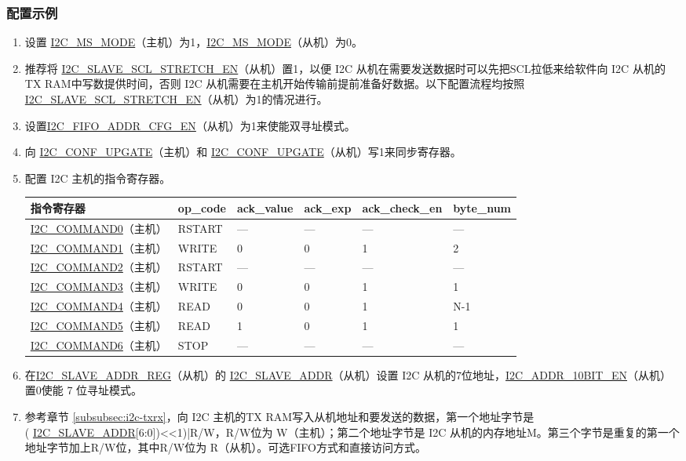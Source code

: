 \documentclass[main\_\_CN.tex]{subfiles}
\begin{document}
\subsubsection{配置示例}
\begin{enumerate}
\item 设置 \hyperref[fielddesc:I2CMSMODE]{I2C\_MS\_MODE}（主机）为1，\hyperref[fielddesc:I2CMSMODE]{I2C\_MS\_MODE}（从机）为0。
\item 推荐将 \hyperref[fielddesc:I2CSLAVESCLSTRETCHEN]{I2C\_SLAVE\_SCL\_STRETCH\_EN}（从机）置1，以便 I2C 从机在需要发送数据时可以先把SCL拉低来给软件向 I2C 从机的TX RAM中写数提供时间，否则 I2C 从机需要在主机开始传输前提前准备好数据。以下配置流程均按照\hyperref[fielddesc:I2CSLAVESCLSTRETCHEN]{I2C\_SLAVE\_SCL\_STRETCH\_EN}（从机）为1的情况进行。
\item 设置\hyperref[fielddesc:I2CFIFOADDRCFGEN]{I2C\_FIFO\_ADDR\_CFG\_EN}（从机）为1来使能双寻址模式。
\item 向 \hyperref[fielddesc:I2CCONFUPGATE]{I2C\_CONF\_UPGATE}（主机）和 \hyperref[fielddesc:I2CCONFUPGATE]{I2C\_CONF\_UPGATE}（从机）写1来同步寄存器。
\item 配置 I2C 主机的指令寄存器。
\begin{longtable}{ | p{4cm} | p{2cm} | p{2cm} | p{2cm} |p{2cm} | p{2cm} |}
\hline\rowcolor{lightgray}
指令寄存器& op\_code & ack\_value&ack\_exp&ack\_check\_en&byte\_num  \\ \hline
\hyperref[fielddesc:I2CCOMMAND0]{I2C\_COMMAND0}（主机）& RSTART& ---&---&---&---  \\ \hline
\hyperref[fielddesc:I2CCOMMAND1]{I2C\_COMMAND1}（主机）& WRITE& 0&0&1&2  \\ \hline
\hyperref[fielddesc:I2CCOMMAND2]{I2C\_COMMAND2}（主机）& RSTART& ---&---&---&---  \\ \hline
\hyperref[fielddesc:I2CCOMMAND3]{I2C\_COMMAND3}（主机）& WRITE& 0&0&1&1  \\ \hline
\hyperref[fielddesc:I2CCOMMAND4]{I2C\_COMMAND4}（主机）& READ& 0&0&1&N-1  \\ \hline
\hyperref[fielddesc:I2CCOMMAND5]{I2C\_COMMAND5}（主机）& READ& 1&0&1&1  \\ \hline
\hyperref[fielddesc:I2CCOMMAND6]{I2C\_COMMAND6}（主机）& STOP& ---&---&---&---  \\ \hline
\end{longtable}

\item 在\hyperref[regdesc:I2CSLAVEADDRREG]{I2C\_SLAVE\_ADDR\_REG}（从机）的 \hyperref[fielddesc:I2CSLAVEADDR]{I2C\_SLAVE\_ADDR}（从机）设置 I2C 从机的7位地址，\hyperref[fielddesc:I2CADDR10BITEN]{I2C\_ADDR\_10BIT\_EN}（从机）置0使能 7 位寻址模式。
\item 参考章节 \ref{subsubsec:i2c-txrx}，向 I2C 主机的TX RAM写入从机地址和要发送的数据，第一个地址字节是 \\( \hyperref[fielddesc:I2CSLAVEADDR]{I2C\_SLAVE\_ADDR}[6:0])<<1)|R/W，R/W位为 W（主机）；第二个地址字节是 I2C 从机的内存地址M。第三个字节是重复的第一个地址字节加上R/W位，其中R/W位为 R（从机）。可选FIFO方式和直接访问方式。


\end{enumerate}
\end{document}
